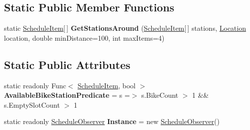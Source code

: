 \subsection*{Static Public Member Functions}
\begin{DoxyCompactItemize}
\item 
static \hyperlink{class_w_c_c_mobile_1_1_models_1_1_schedule_item}{Schedule\+Item}\mbox{[}$\,$\mbox{]} {\bfseries Get\+Stations\+Around} (\hyperlink{class_w_c_c_mobile_1_1_models_1_1_schedule_item}{Schedule\+Item}\mbox{[}$\,$\mbox{]} stations, \hyperlink{struct_w_c_c_mobile_1_1_location}{Location} location, double min\+Distance=100, int max\+Items=4)\hypertarget{class_w_c_c_mobile_1_1_schedule_observer_a36bc0a2987055ca966664ada81e5088c}{}\label{class_w_c_c_mobile_1_1_schedule_observer_a36bc0a2987055ca966664ada81e5088c}

\end{DoxyCompactItemize}
\subsection*{Static Public Attributes}
\begin{DoxyCompactItemize}
\item 
static readonly Func$<$ \hyperlink{class_w_c_c_mobile_1_1_models_1_1_schedule_item}{Schedule\+Item}, bool $>$ {\bfseries Available\+Bike\+Station\+Predicate} = s =$>$ s.\+Bike\+Count $>$ 1 \&\& s.\+Empty\+Slot\+Count $>$ 1\hypertarget{class_w_c_c_mobile_1_1_schedule_observer_a718156c9e114254fbcdf9ce3d7fcbad7}{}\label{class_w_c_c_mobile_1_1_schedule_observer_a718156c9e114254fbcdf9ce3d7fcbad7}

\item 
static readonly \hyperlink{class_w_c_c_mobile_1_1_schedule_observer}{Schedule\+Observer} {\bfseries Instance} = new \hyperlink{class_w_c_c_mobile_1_1_schedule_observer}{Schedule\+Observer}()\hypertarget{class_w_c_c_mobile_1_1_schedule_observer_a8e5563a0a73e96a376a84767c5e05849}{}\label{class_w_c_c_mobile_1_1_schedule_observer_a8e5563a0a73e96a376a84767c5e05849}

\end{DoxyCompactItemize}
